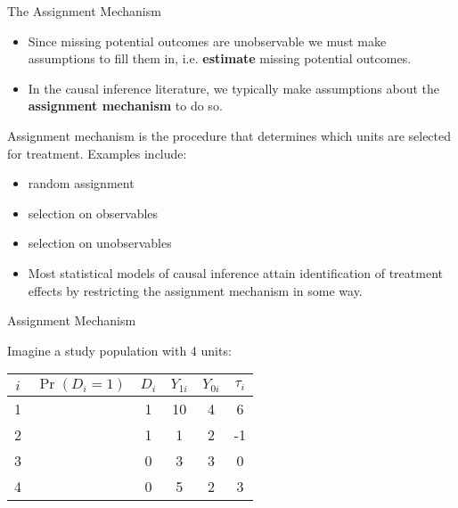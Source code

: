 \documentclass{beamer}
\numberwithin{equation}{section}
\begin{document}
\begin{frame}{The Assignment Mechanism}
\small
\begin{itemize}
\itemsep1pt\parskip0pt
\item
  Since missing potential outcomes are unobservable we must make
  assumptions to fill them in, i.e. \textbf{estimate} missing potential
  outcomes.
\item
  In the causal inference literature, we typically make assumptions
  about the \textbf{assignment mechanism} to do so.
\end{itemize}

\pause 

\begin{definition}
Assignment mechanism is the procedure that determines which units
are selected for treatment. Examples include:
 \begin{itemize}
\item random assignment
\item selection on observables
\item selection on unobservables
\end{itemize}
\end{definition}

\begin{itemize}
\itemsep1pt\parskip0pt
\item
  Most statistical models of causal inference attain identification of
  treatment effects by restricting the assignment mechanism in some way.
\end{itemize}
\end{frame}


\begin{frame}{Assignment Mechanism}

Imagine a study population with 4 units:

\begin{table}[ht]
    \centering
    \begin{tabular}{c c c c c c }
      $i$ &$\Pr(D_i = 1)$ & $D_i$ & $Y_{1i}$ & $Y_{0i}$ & $\tau_i$ \\ \hline
      1  &\color{red}{?} &1 & 10  & 4 & 6 \\
      2  &\color{red}{?} &1 & 1  & 2 & -1 \\
      3 &\color{red}{?} &0 & 3 & 3 & 0 \\
      4 &\color{red}{?} &0 & 5 & 2 & 3 \\
    \end{tabular}
    \end{table}

\end{frame}
\end{document}
